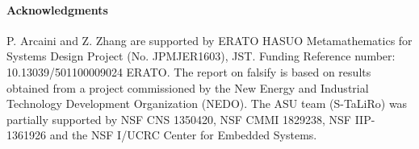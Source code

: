\documentclass[a4paper]{easychair}
\newcommand{\STaLiRo}{S-TaLiRo\xspace}
\newcommand{\falsify}{falsify\xspace}
\begin{document}
\paragraph{Acknowledgments}
P. Arcaini and Z. Zhang are supported by ERATO HASUO Metamathematics for Systems Design Project (No. JPMJER1603), JST. Funding Reference number: 10.13039/501100009024 ERATO.
The report on \falsify is based on results obtained from a project commissioned by the New Energy and Industrial Technology Development Organization (NEDO).
The ASU team (\STaLiRo) was partially supported by NSF CNS 1350420, NSF CMMI 1829238, NSF IIP-1361926 and the NSF I/UCRC Center for Embedded Systems.


	
	
\end{document}
